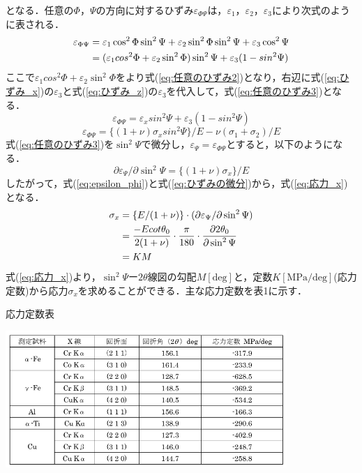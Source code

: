 となる．任意の$\Phi$，$\Psi$の方向に対するひずみ$\varepsilon_{\Phi\Psi}$は，$\varepsilon_1$，$\varepsilon_2$，$\varepsilon_3$により次式のように表される．
\begin{align}
    \varepsilon_{\Phi\Psi} &= \varepsilon_1\cos^2\Phi \sin^2\Psi + \varepsilon_2\sin^2\Phi\sin^2\Psi + \varepsilon_3\cos^2\Psi \notag \\
    &= (\varepsilon_1cos^2\Phi + \varepsilon_2\sin^2\Phi)\sin^2\Psi + \varepsilon_3(1 - sin^2\Psi) \label{eq:任意のひずみ}
\end{align}
ここで$\varepsilon_1cos^2\Phi + \varepsilon_2\sin^2\Phi$をより式(\ref{eq:任意のひずみ2})となり，右辺に式(\ref{eq:ひずみ_x})の$\varepsilon_3$と式(\ref{eq:ひずみ_z})の$\varepsilon_3$を代入して，式(\ref{eq:任意のひずみ3})となる．
\begin{equation}
    \varepsilon_{\Phi\Psi} = \varepsilon_xsin^2\Psi + \varepsilon_3(1 - sin^2\Psi)
    \label{eq:任意のひずみ2}
\end{equation}
\begin{equation}
    \varepsilon_{\Phi\Psi} = \{(1 + \nu)\sigma_xsin^2\Psi\}/E - \nu(\sigma_1 + \sigma_2)/E 
    \label{eq:任意のひずみ3}
\end{equation}
式(\ref{eq:任意のひずみ3})を$\sin^2\Psi$で微分し，$\varepsilon_\Psi = \varepsilon_{\Phi\Psi}$とすると，以下のようになる．
\begin{equation}
    \partial \varepsilon_\Psi/\partial \sin^2\Psi = \{(1 + \nu)\sigma_x\}/E
    \label{eq:ひずみの微分}
\end{equation}
したがって，式(\ref{eq:epsilon_phi})と式(\ref{eq:ひずみの微分})から，式(\ref{eq:応力_x})となる．
\begin{align}
    \sigma_x &= \{E/(1 + \nu)\} \cdot (\partial \varepsilon_\Psi/\partial \sin^2\Psi) \notag \\
    &= \frac{-Ecot\theta_0}{2(1 + \nu)} \cdot \frac{\pi}{180} \cdot \frac{\partial 2\theta_0}{\partial \sin^2\Psi} \notag \\
    &= KM
    \label{eq:応力_x}
\end{align}
式(\ref{eq:応力_x})より，$\sin^2\Psi$ー$2\theta$線図の勾配$M[\mathrm{deg}]$と，定数$K[\mathrm{MPa/deg}]$(応力定数)から応力$\sigma_x$を求めることができる．主な応力定数を表1に示す．
\begin{table}[htbp]
    \centering
    \caption{応力定数表} %
    \label{tbl:応力定数表} %
    \includegraphics[width=0.8\textwidth]{fig/応力定数表.png} %
\end{table}
